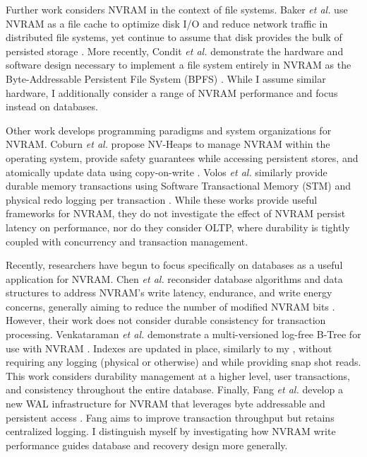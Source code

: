 Further work considers NVRAM in the context of file systems.
Baker \emph{et al.} use NVRAM as a file cache to optimize disk I/O and reduce network traffic in distributed file systems, yet continue to assume that disk provides the bulk of persisted storage \cite{BakerAsami92}.
More recently, Condit \emph{et al.} demonstrate the hardware and software design necessary to implement a file system entirely in NVRAM as the Byte-Addressable Persistent File System (BPFS) \cite{ConditNightingale09}.
While I assume similar hardware, I additionally consider a range of NVRAM performance and focus instead on databases.

Other work develops programming paradigms and system organizations for NVRAM.
Coburn \emph{et al.} propose NV-Heaps to manage NVRAM within the operating system, provide safety guarantees while accessing persistent stores, and atomically update data using copy-on-write \cite{CoburnCaulfield11}.
Volos \emph{et al.} similarly provide durable memory transactions using Software Transactional Memory (STM) and physical redo logging per transaction \cite{VolosTack11}.
While these works provide useful frameworks for NVRAM, they do not investigate the effect of NVRAM persist latency on performance, nor do they consider OLTP, where durability is tightly coupled with concurrency and transaction management.

Recently, researchers have begun to focus specifically on databases as a useful application for NVRAM.
Chen \emph{et al.} reconsider database algorithms and data structures to address NVRAM's write latency, endurance, and write energy concerns, generally aiming to reduce the number of modified NVRAM bits \cite{ChenGibbons11}.
However, their work does not consider durable consistency for transaction processing.
Venkataraman \emph{et al.} demonstrate a multi-versioned log-free B-Tree for use with NVRAM \cite{VenkataramanTolia11}.
Indexes are updated in place, similarly to my \InPlace, without requiring any logging (physical or otherwise) and while providing snap shot reads.
This work considers durability management at a higher level, user transactions, and consistency throughout the entire database.
Finally, Fang \emph{et al.} develop a new WAL infrastructure for NVRAM that leverages byte addressable and persistent access \cite{FangHsiao11}.
Fang aims to improve transaction throughput but retains centralized logging.
I distinguish myself by investigating how NVRAM write performance guides database and recovery design more generally.


